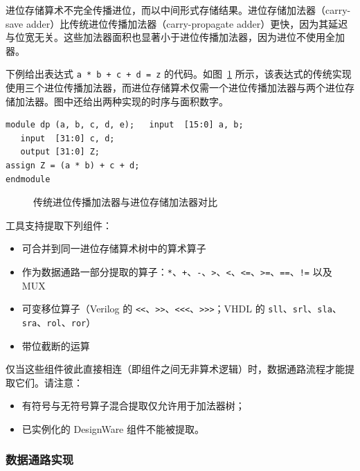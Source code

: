 进位存储算术不完全传播进位，而以中间形式存储结果。进位存储加法器（carry-save adder）比传统进位传播加法器（carry-propagate adder）更快，因为其延迟与位宽无关。这些加法器面积也显著小于进位传播加法器，因为进位不使用全加器。

下例给出表达式 \texttt{a * b + c + d = z} 的代码。如图~\ref{fig:cpa-vs-csa} 所示，该表达式的传统实现使用三个进位传播加法器，而进位存储算术仅需一个进位传播加法器与两个进位存储加法器。图中还给出两种实现的时序与面积数字。
\begin{lstlisting}
module dp (a, b, c, d, e);   input  [15:0] a, b;
   input  [31:0] c, d;
   output [31:0] Z;
assign Z = (a * b) + c + d;
endmodule
\end{lstlisting}

\begin{figure}[htbp]
\centering
{}
\caption{传统进位传播加法器与进位存储加法器对比}
\label{fig:cpa-vs-csa}
\end{figure}

工具支持提取下列组件：
\begin{itemize}
  \item 可合并到同一进位存储算术树中的算术算子
  \item 作为数据通路一部分提取的算子：\texttt{*}、\texttt{+}、\texttt{-}、\texttt{>}、\texttt{<}、\texttt{<=}、\texttt{>=}、\texttt{==}、\texttt{!=} 以及 MUX
  \item 可变移位算子（Verilog 的 \texttt{<<}、\texttt{>>}、\texttt{<<<}、\texttt{>>>}；VHDL 的 \texttt{sll}、\texttt{srl}、\texttt{sla}、\texttt{sra}、\texttt{rol}、\texttt{ror}）
  \item 带位截断的运算
\end{itemize}

仅当这些组件彼此直接相连（即组件之间无非算术逻辑）时，数据通路流程才能提取它们。请注意：
\begin{itemize}
  \item 有符号与无符号算子混合提取仅允许用于加法器树；
  \item 已实例化的 DesignWare 组件不能被提取。
\end{itemize}

\subsubsection{数据通路实现}
